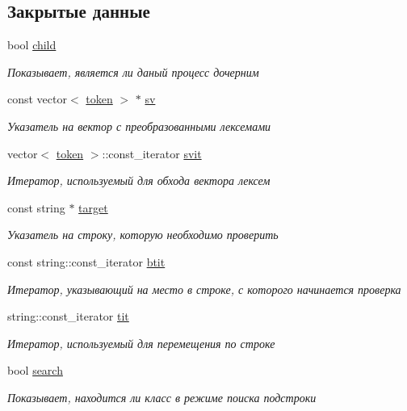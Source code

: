 \subsection*{Закрытые данные}
\begin{DoxyCompactItemize}
\item 
bool \hyperlink{class_regexp_checker_a5003c015965ce4177450557c01543812}{child}
\begin{DoxyCompactList}\small\item\em Показывает, является ли даный процесс дочерним \end{DoxyCompactList}\item 
const vector$<$ \hyperlink{structtoken}{token} $>$ $\ast$ \hyperlink{class_regexp_checker_a4542347ee72d793d080b046be483d397}{sv}
\begin{DoxyCompactList}\small\item\em Указатель на вектор с преобразованными лексемами \end{DoxyCompactList}\item 
vector$<$ \hyperlink{structtoken}{token} $>$\+::const\+\_\+iterator \hyperlink{class_regexp_checker_a9823ceadabc26fe4c9042a86dddb4e34}{svit}
\begin{DoxyCompactList}\small\item\em Итератор, используемый для обхода вектора лексем \end{DoxyCompactList}\item 
const string $\ast$ \hyperlink{class_regexp_checker_a9a5672b777e0718a778e9061c3f579e6}{target}
\begin{DoxyCompactList}\small\item\em Указатель на строку, которую необходимо проверить \end{DoxyCompactList}\item 
const string\+::const\+\_\+iterator \hyperlink{class_regexp_checker_a54f557b93e0f498422185294726d129c}{btit}
\begin{DoxyCompactList}\small\item\em Итератор, указывающий на место в строке, с которого начинается проверка \end{DoxyCompactList}\item 
string\+::const\+\_\+iterator \hyperlink{class_regexp_checker_a782456d19baedddca76f23c3efd8cc53}{tit}
\begin{DoxyCompactList}\small\item\em Итератор, используемый для перемещения по строке \end{DoxyCompactList}\item 
bool \hyperlink{class_regexp_checker_a76fa7992eddb6adcd63d9df0e5db1a92}{search}
\begin{DoxyCompactList}\small\item\em Показывает, находится ли класс в режиме поиска подстроки \end{DoxyCompactList}\end{DoxyCompactItemize}


